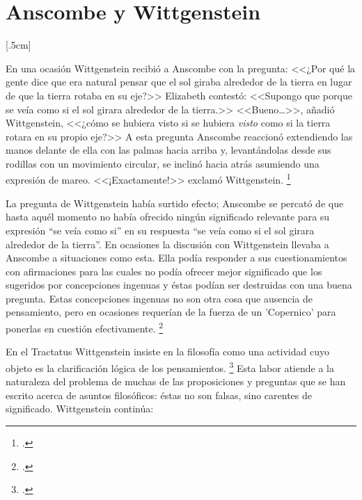 \section{Anscombe y Wittgenstein}

[.5cm]


En una ocasión Wittgenstein recibió a Anscombe con la pregunta: <<¿Por qué la gente dice que era natural pensar que el sol giraba alrededor de la tierra en lugar de que la tierra rotaba en su eje?>> Elizabeth contestó: <<Supongo que porque se veía como si el sol girara alrededor de la tierra.>> <<Bueno\ldots>>, añadió Wittgenstein, <<¿cómo se hubiera visto si se hubiera \emph{visto} como si la tierra rotara en su propio eje?>> A esta pregunta Anscombe reaccionó extendiendo las manos delante de ella con las palmas hacia arriba y, levantándolas desde sus rodillas con un movimiento circular, se inclinó hacia atrás asumiendo una expresión de mareo. <<¡Exactamente!>> exclamó Wittgenstein. \footcite[151]{IWT}


La pregunta de Wittgenstein había surtido efecto; Anscombe se percató de que hasta aquél momento no había ofrecido ningún significado relevante para su expresión ``se veía como si'' en su respuesta ``se veía como si el sol girara alrededor de la tierra''. En ocasiones la discusión con Wittgenstein llevaba a Anscombe a situaciones como esta. Ella podía responder a sus cuestionamientos con afirmaciones para las cuales no podía ofrecer mejor significado que los sugeridos por concepciones ingenuas y éstas podían ser destruidas con una buena pregunta. Estas concepciones ingenuas no son otra cosa que ausencia de pensamiento, pero en ocasiones requerían de la fuerza de un 'Copernico' para ponerlas en cuestión efectivamente.  \footcite[cf. 151]{IWT}



En el Tractatus Wittgenstein insiste en la filosofía como una actividad cuyo objeto es la clarificación lógica de los pensamientos. \footcite[4.112 p. 52]{tractatus} Esta labor atiende a la naturaleza del problema de muchas de las proposiciones y preguntas que se han escrito acerca de asuntos filosóficos: éstas no son falsas, sino carentes de significado. Wittgenstein continúa:

